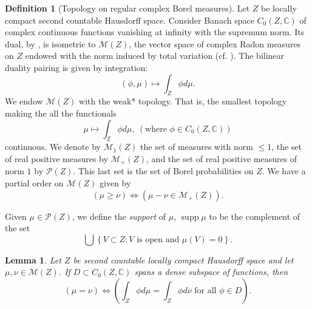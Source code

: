 \documentclass[reqno,11pt, twoside]{amsart}
\theoremstyle{plain}
\newtheorem{lem}[thm]{Lemma}
\theoremstyle{definition}
\newtheorem{defn}[thm]{Definition}
\theoremstyle{definition}
\theoremstyle{remark}
\numberwithin{equation}{section}
\newcommand\ca[1]{\mathcal{#1}}
\newcommand{\Co}{{\mathbb{C}}}
\newcommand\on[1]{\operatorname{#1}}
\begin{document}
\begin{defn}[Topology on regular complex Borel measures]\label{defn: Borel measures}
    Let $Z$ be locally compact second countable Hausdorff space. 
    Consider Banach space $C_0(Z,\Co)$ of complex continuous functions vanishing at infinity with the supremum norm. Its dual, by \cite[Theorem 6.19]{Ru-RACA}, is isometric to $\mathcal{M}(Z)$, the vector space of complex Radon measures on $Z$ endowed with the norm induced by total variation (cf. \cite[Chapter 6]{Ru-RACA}). The bilinear duality pairing is given by integration:
    \begin{equation*}
        (\phi,\mu) \mapsto \int_Z \phi d\mu.
    \end{equation*}
We endow $\mathcal{M}(Z)$ with the weak* topology. That is, the smallest topology making the all the functionals
\begin{equation*}
    \mu \mapsto \int_Z \phi d\mu,\ (\text{where } \phi \in C_0(Z,\Co))
\end{equation*}
continuous.
We denote by $\mathcal{M}_1(Z)$ the set of measures with norm $\leq 1$, the set of real positive measures by $\ca{M}_+(Z)$, and the set of real positive measures of norm $1$ by $\ca{P}(Z)$. This last set is the set of Borel probabilities on $Z$.
We have a partial order on $\ca{M}(Z)$ given by 
\begin{equation*}
    \left(\mu \geq  \nu\right) \iff \left(\mu - \nu \in \ca{M}_+(Z)\right).
\end{equation*}
\end{defn}
Given $\mu \in \ca{P}(Z)$, we define the \textit{support} of $\mu$, $\on{supp} \mu$ to be the complement of the set
\begin{equation*}
    \bigcup\left\lbrace V \subset Z: V \text{ is open and } \mu(V)=0 \right\rbrace.
\end{equation*}
\begin{lem}\label{lem: measures are equal if they agree on dense set}
    Let $Z$ be second countable locally compact Hausdorff space and let $\mu, \nu \in \mathcal{M}(Z)$. If $D \subset C_0(Z, \Co)$ spans a dense subspace of functions, then 
    \begin{equation*}
        \left(\mu = \nu\right) \iff \left(\int_Z \phi d\mu = \int_Z \phi d\nu \text{ for all } \phi \in D \right).
    \end{equation*}
\end{lem}
\end{document}
